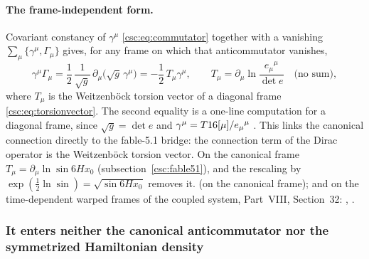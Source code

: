 \paragraph{The frame-independent form.} Covariant constancy of $\gamma^\mu$
\eqref{csc:eq:commutator} together with a vanishing $\sum_\mu\{\gamma^\mu,\Gamma_\mu\}$ gives, for
any frame on which that anticommutator vanishes,
\begin{equation}
  \gamma^\mu\Gamma_\mu=\frac12\,\frac{1}{\sqrt g}\,\partial_\mu\bigl(\sqrt g\,\gamma^\mu\bigr)=-\frac12\,T_\mu\gamma^\mu,
  \qquad T_\mu=\partial_\mu\ln\frac{e_\mu{}^\mu}{\det e}\quad\text{(no sum)},
\end{equation}
where $T_\mu$ is the Weitzenb\"ock torsion vector of a diagonal frame \eqref{csc:eq:torsionvector}.
The second equality is a one-line computation for a diagonal frame, since $\sqrt g=\det e$ and
$\gamma^\mu=T16[\mu]/e_\mu{}^\mu$ \cfderived. This links the canonical connection directly to the
fable-5.1 bridge: the connection term of the Dirac operator is the Weitzenb\"ock torsion vector. On
the canonical frame $T_\mu=\partial_\mu\ln\sin 6Hx_0$ (subsection~\ref{csc:fable51}), and the
rescaling by $\exp(\tfrac12\ln\sin)=\sqrt{\sin 6Hx_0}$ removes it. 
 (on the canonical frame); and on the time-dependent warped frames of the coupled system, Part~VIII, Section~32: , .

\subsubsection{It enters neither the canonical anticommutator nor the symmetrized Hamiltonian density}
\label{sec:9.12.4}

